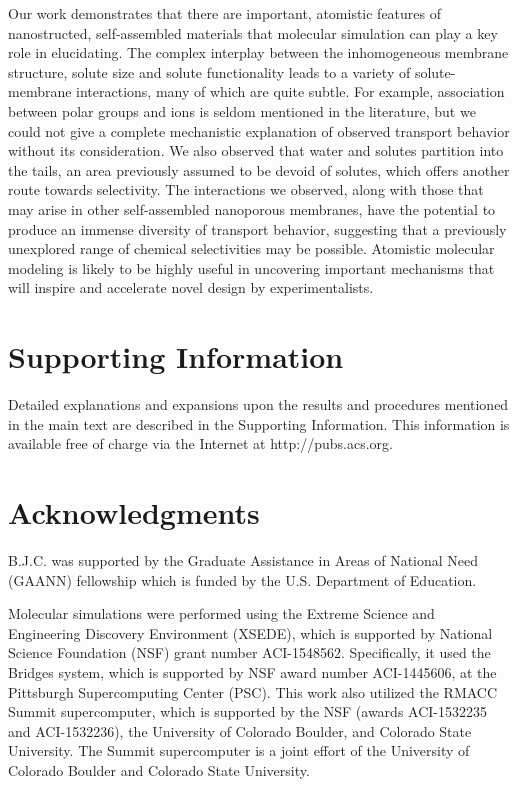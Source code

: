 \documentclass[journal=jpcbfk,manuscript=article]{achemso}
\begin{document}
  Our work demonstrates that there are important, atomistic features of nanostructed, 
  self-assembled materials that molecular simulation can play a key role in elucidating.
  The complex interplay between the inhomogeneous membrane structure, solute size and 
  solute functionality leads to a variety of solute-membrane interactions, many of which
  are quite subtle. For example, association between polar groups and ions is seldom 
  mentioned in the literature, but we could not give a complete mechanistic explanation
  of observed transport behavior without its consideration. We also observed that water
  and solutes partition into the tails, an area previously assumed to be devoid of solutes,
  which offers another route towards selectivity. The interactions we observed, along 
  with those that may arise in other self-assembled nanoporous membranes, have the 
  potential to produce an immense diversity of transport behavior, suggesting that a 
  previously unexplored range of chemical selectivities may be possible. Atomistic 
  molecular modeling is likely to be highly useful in uncovering important mechanisms
  that will inspire and accelerate novel design by experimentalists.

  \section*{Supporting Information}

  Detailed explanations and expansions upon the results and procedures mentioned in
  the main text are described in the Supporting Information. This information is
  available free of charge via the Internet at http://pubs.acs.org.

  \section*{Acknowledgments}

  B.J.C. was supported by the Graduate Assistance in Areas of National Need (GAANN) 
  fellowship which is funded by the U.S. Department of Education. 

  Molecular simulations were performed using the Extreme Science and
  Engineering Discovery Environment (XSEDE), which is supported by National
  Science Foundation (NSF) grant number ACI-1548562. Specifically, it used the Bridges
  system, which is supported by NSF award number ACI-1445606, at the Pittsburgh
  Supercomputing Center (PSC). This work also utilized the RMACC Summit supercomputer,
  which is supported by the NSF (awards ACI-1532235 and
  ACI-1532236), the University of Colorado Boulder, and Colorado State
  University. The Summit supercomputer is a joint effort of the University of
  Colorado Boulder and Colorado State University.
  
\end{document}
